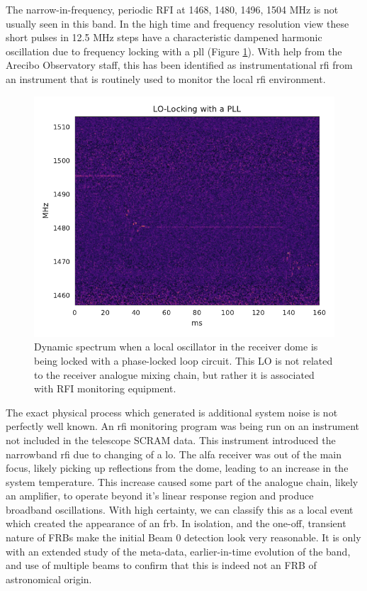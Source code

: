 \documentclass[a4paper,fleqn,usenatbib]{mnras}
\begin{document}
The narrow-in-frequency, periodic RFI at 1468, 1480, 1496,
1504 MHz is not usually seen in this band. In the high time and frequency
resolution view these short pulses in 12.5 MHz steps have a characteristic
dampened harmonic oscillation due to frequency locking with a \gls{pll} (Figure
\ref{fig:pll_spectrum}). With help from the Arecibo Observatory staff, this has
been identified as instrumentational \gls{rfi} from an instrument that is
routinely used to monitor the local \gls{rfi} environment.
%
\begin{figure}
    \includegraphics[width=1.0\linewidth]{figures/pll_spectrum.pdf}
    \caption{Dynamic spectrum when a local oscillator in the receiver dome is
    being locked with a phase-locked loop circuit. This LO is not related to
    the receiver analogue mixing chain, but rather it is associated with RFI
    monitoring equipment.
    }
    \label{fig:pll_spectrum}
\end{figure}
%
The exact physical process which generated is additional system noise is not
perfectly well known.  An \gls{rfi} monitoring program was being run on an
instrument not included in the telescope SCRAM data. This instrument introduced
the narrowband \gls{rfi} due to changing of a \gls{lo}.  The \gls{alfa} receiver
was out of the main focus, likely picking up reflections from the dome, leading
to an increase in the system temperature.  This increase caused some part of the
analogue chain, likely an amplifier, to operate beyond it's linear response
region and produce broadband oscillations.  With high certainty, we can classify
this as a local event which created the appearance of an \gls{frb}.  In
isolation, and the one-off, transient nature of FRBs make the initial Beam 0
detection look very reasonable. It is only with an extended study of the
meta-data, earlier-in-time evolution of the band, and use of multiple beams to
confirm that this is indeed not an FRB of astronomical origin.
\end{document}
